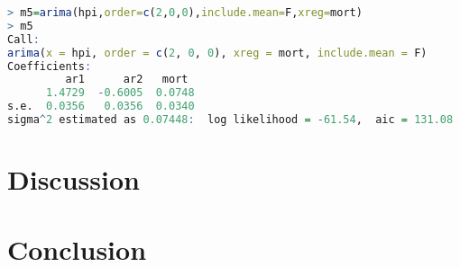 \documentclass[12pt,letterpaper]{article}
\begin{document}
{\footnotesize
\begin{lstlisting}[language=R]
> m5=arima(hpi,order=c(2,0,0),include.mean=F,xreg=mort)
> m5
Call:
arima(x = hpi, order = c(2, 0, 0), xreg = mort, include.mean = F)
Coefficients:
         ar1      ar2   mort
      1.4729  -0.6005  0.0748
s.e.  0.0356   0.0356  0.0340
sigma^2 estimated as 0.07448:  log likelihood = -61.54,  aic = 131.08
\end{lstlisting}
}


\section{Discussion}

\section{Conclusion}
\end{document}
